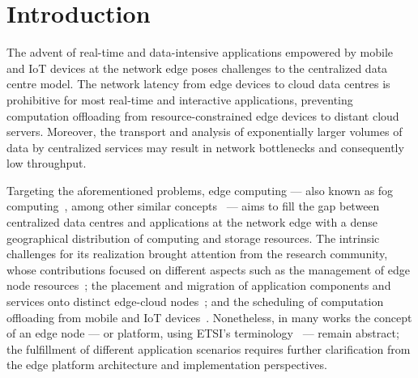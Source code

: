 \section{Introduction}

The advent of real-time and data-intensive applications empowered by mobile and IoT devices at the network edge poses challenges to the centralized data centre model. The network latency from edge devices to cloud data centres is prohibitive for most real-time and interactive applications, preventing computation offloading from resource-constrained edge devices to distant cloud servers. Moreover, the transport and analysis of exponentially larger volumes of data by centralized services may result in network bottlenecks and consequently low throughput. 

Targeting the aforementioned problems, edge computing --- also known as fog computing~\cite{Bonomi:2012}, among other similar concepts~\cite{Satyanarayanan:2009,Taleb:2013,ETSI:MEC:2016:03} --- aims to fill the gap between centralized data centres and applications at the network edge with a dense geographical distribution of computing and storage resources. The intrinsic challenges for its realization brought attention from the research community, whose contributions focused on different aspects such as the management of edge node resources~\cite{N.Wang:2017}; the placement and migration of application components and services onto distinct edge-cloud nodes~\cite{Wang:2015a,Wang:2017,Machen:2018}; and the scheduling of computation offloading from mobile and IoT devices~\cite{Liu:2016, OrsiniBL16}. Nonetheless, in many works the concept of an edge node --- or platform, using ETSI's terminology~\cite{ETSI:MEC:2016:03} --- remain abstract; the fulfillment of different application scenarios requires further clarification from the edge platform architecture and implementation perspectives.










